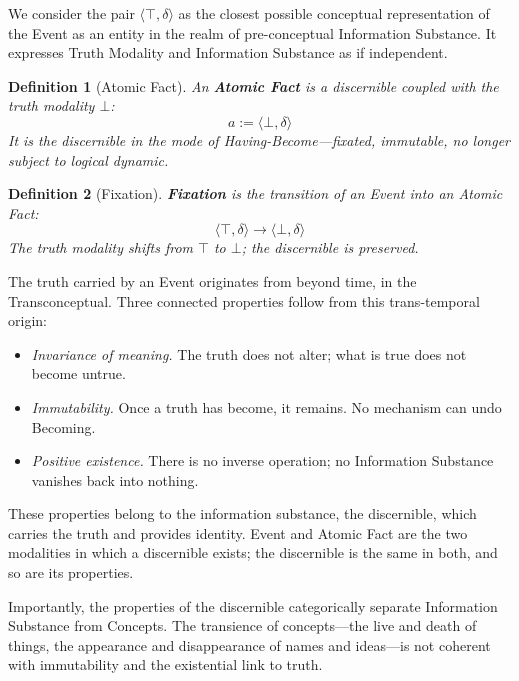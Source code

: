 \documentclass[11pt, a4paper]{article}
\theoremstyle{formalism}
\newtheorem{formalism}{Definition}
\begin{document}
We consider the pair $\langle \top, \delta \rangle$ as the closest possible
conceptual representation of the Event as an entity in the realm of
pre-conceptual Information Substance. It expresses Truth Modality and
Information Substance as if independent.

\begin{formalism}[Atomic Fact]
    An \textbf{Atomic Fact} is a discernible coupled with the truth modality
    $\bot$:
    \begin{equation}
        a := \langle \bot, \delta \rangle
    \end{equation}
    It is the discernible in the mode of \textit{Having-Become}---fixated,
    immutable, no longer subject to logical dynamic.
\end{formalism}

\begin{formalism}[Fixation]
    \textbf{Fixation} is the transition of an Event into an Atomic Fact:
    \begin{equation}
        \langle \top, \delta \rangle \rightarrow \langle \bot, \delta \rangle
    \end{equation}
    The truth modality shifts from $\top$ to $\bot$; the discernible is
    preserved.
\end{formalism}

The truth carried by an Event originates from beyond time, in the
Transconceptual. Three connected properties follow from this trans-temporal
origin:

\begin{itemize}
    \item \textit{Invariance of meaning.} The truth does not alter; what is
    true does not become untrue.
    \item \textit{Immutability.} Once a truth has become, it remains. No
    mechanism can undo Becoming.
    \item \textit{Positive existence.} There is no inverse operation; no
    Information Substance vanishes back into nothing.
\end{itemize}

These properties belong to the information substance, the discernible, which
carries the truth and provides identity. Event and Atomic Fact are the two
modalities in which a discernible exists; the discernible is the same in both,
and so are its properties.

Importantly, the properties of the discernible categorically separate
Information Substance from Concepts. The transience of concepts---the live and
death of things, the appearance and disappearance of names and ideas---is not
coherent with immutability and the existential link to truth.
\end{document}
